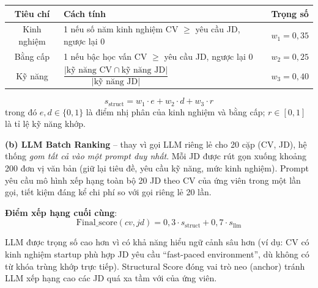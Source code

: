 \documentclass[../DoAn.tex]{subfiles}
\begin{document}
\begin{table}[H]
\centering
\begin{tabular}{|c|p{5.5cm}|c|}
\hline
\textbf{Tiêu chí} & \textbf{Cách tính} & \textbf{Trọng số} \\ \hline
Kinh nghiệm & 1 nếu số năm kinh nghiệm CV $\geq$ yêu cầu JD, ngược lại 0 & $w_1 = 0{,}35$ \\ \hline
Bằng cấp & 1 nếu bậc học vấn CV $\geq$ yêu cầu JD, ngược lại 0 & $w_2 = 0{,}25$ \\ \hline
Kỹ năng & $\dfrac{|\text{kỹ năng CV} \cap \text{kỹ năng JD}|}{|\text{kỹ năng JD}|}$ & $w_3 = 0{,}40$ \\ \hline
\end{tabular}
\end{table}
\vspace{-0.3cm}
\begin{equation}
s_{\text{struct}} = w_1 \cdot e + w_2 \cdot d + w_3 \cdot r
\label{eq:struct}
\end{equation}
trong đó $e, d \in \{0,1\}$ là điểm nhị phân của kinh nghiệm và bằng cấp; $r \in [0,1]$ là tỉ lệ kỹ năng khớp.

\textbf{(b) LLM Batch Ranking} -- thay vì gọi LLM riêng lẻ cho 20 cặp (CV, JD), hệ thống \textit{gom tất cả vào một prompt duy nhất}. Mỗi JD được rút gọn xuống khoảng 200 đơn vị văn bản (giữ lại tiêu đề, yêu cầu kỹ năng, mức kinh nghiệm). Prompt yêu cầu mô hình xếp hạng toàn bộ 20 JD theo CV của ứng viên trong một lần gọi, tiết kiệm đáng kể chi phí so với gọi riêng lẻ 20 lần.

\textbf{Điểm xếp hạng cuối cùng}:
\begin{equation}
\text{Final\_score}(cv, jd) = 0{,}3 \cdot s_{\text{struct}} + 0{,}7 \cdot s_{\text{llm}}
\label{eq:final}
\end{equation}

LLM được trọng số cao hơn vì có khả năng hiểu ngữ cảnh sâu hơn (ví dụ: CV có kinh nghiệm startup phù hợp JD yêu cầu ``fast-paced environment'', dù không có từ khóa trùng khớp trực tiếp). Structural Score đóng vai trò neo (anchor) tránh LLM xếp hạng cao các JD quá xa tầm với của ứng viên.
\end{document}
